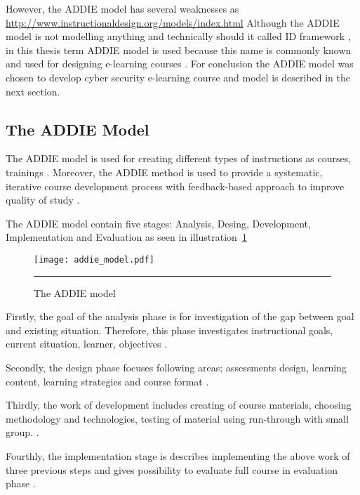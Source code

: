  However, the \gls{ADDIE} model has several weaknesses as \url{http://www.instructionaldesign.org/models/index.html}
Although the ADDIE model is not modelling anything and technically should it called \gls{ID} framework \citep{bichelmeyer2004addie}, in this thesis term ADDIE model is used because this name is commonly known and used for designing e-learning courses \citep{bichelmeyer2004addie, OppeArenduskeskus2010}.
For conclusion the \gls{ADDIE} model was chosen to develop cyber security e-learning course and model is described in the next section.

\subsection{The ADDIE Model}

The \gls{ADDIE} model is used for creating different types of instructions as courses, trainings \citep{website:addie, lohr1998using}. Moreover, the ADDIE method is  used to provide a systematic, iterative course development process with feedback-based approach to improve quality of study \citep{website:using_addie}.

The ADDIE model contain five stages: Analysis, Desing, Development, Implementation and Evaluation as seen in illustration~\ref{figure:the addie model} \citep{website:addie}



\begin{figure}
 \centering 
 \texttt{[image: addie\_model.pdf]}
 \rule{35em}{0.5pt} 
 \caption{The ADDIE model} 
 \label{figure:the addie model} 
\end{figure}

Firstly, the goal of the analysis phase is for investigation of the gap between goal and
existing situation. Therefore, this phase investigates instructional goals, current situation, learner, objectives \citep{chen2007learning, website:addie}.

Secondly, the design phase focuses following areas; assessments design, learning content, learning strategies and course format \citep{chen2007learning, website:addie}.


Thirdly, the work of development includes creating of course materials, choosing methodology and technologies, testing of material using run-through with small group. \citep{OppeArenduskeskus2010, website:addie, chen2007learning}.


Fourthly, the implementation stage is describes implementing the above work of three previous steps and gives possibility to evaluate full course in evaluation phase \citep{chen2007learning, website:addie}.


